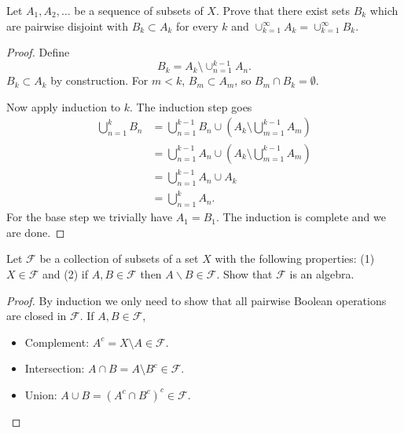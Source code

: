 \begin{problem}
	Let $A_1, A_2, \ldots$ be a sequence of subsets of $X$. Prove that there exist sets $B_k$ which are pairwise disjoint with $B_k \subset A_k$ for every $k$ and $\cup_{k=1}^{\infty} A_k=\cup_{k=1}^{\infty} B_k$.
\end{problem}
\begin{proof}
	Define
	\[
		B_k = A_k \setminus \cup _{n = 1}^{k - 1} A_n
	.\] 
	$B_k \subset A_k$ by construction. For $m < k$, $B_m \subset A_m$, so $B_m \cap B_k = \emptyset $. 

	Now apply induction to $k$. The induction step goes
	\begin{align*}
		\bigcup_{n = 1} ^k B_n 
		&= \bigcup_{n = 1} ^{k - 1} B_n \cup \left( A_k \setminus \bigcup_{m = 1} ^{k - 1}A_m \right) \\
		&= \bigcup_{n = 1} ^{k - 1} A_n \cup \left( A_k \setminus \bigcup_{m = 1} ^{k - 1}A_m \right) \\
		&= \bigcup_{n = 1} ^{k - 1} A_n \cup  A_k  \\
		&= \bigcup_{n = 1} ^{k } A_n 
	.\end{align*} 
	For the base step we trivially have $A_1 = B_1$. The induction is complete and we are done.
\end{proof}

\begin{problem}
	Let $\mathcal{F}$ be a collection of subsets of a set $X$ with the following properties: (1) $X \in \mathcal{F}$ and (2) if $A, B \in \mathcal{F}$ then $A \backslash B \in \mathcal{F}$. Show that $\mathcal{F}$ is an algebra.
\end{problem}
\begin{proof}
	By induction we only need to show that all pairwise Boolean operations are closed in $\mathcal{F}$. If $A, B \in \mathcal{F}$,
	\begin{itemize}
		\item Complement: $A^c = X \setminus  A \in \mathcal{F}$.
		\item Intersection: $A \cap B = A \setminus  B^c \in \mathcal{F}$.
		\item Union: $A \cup B = (A^c \cap B^c)^c \in \mathcal{F}$.
	\end{itemize}
\end{proof}

